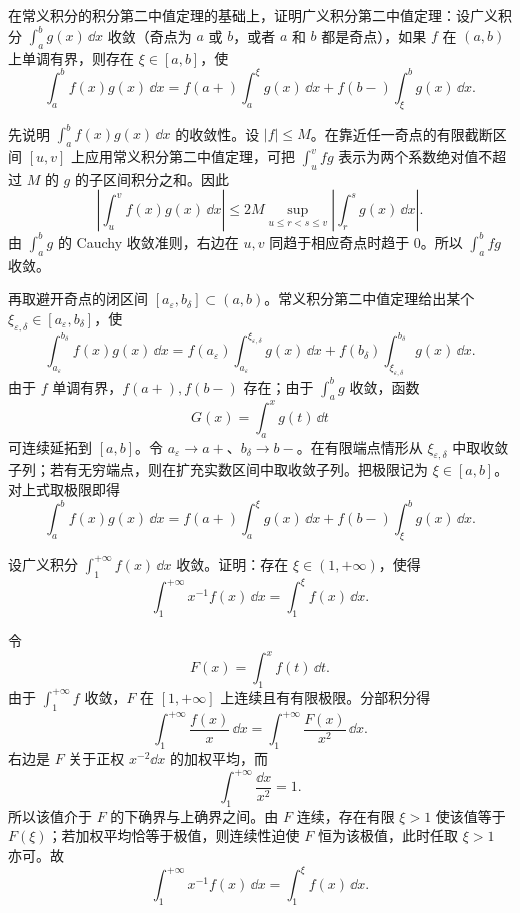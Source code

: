 \begin{xreferenceproblem}[13]
在常义积分的积分第二中值定理的基础上，证明广义积分第二中值定理：设广义积分 $\int_a^b g(x)\,\dd x$ 收敛（奇点为 $a$ 或 $b$，或者 $a$ 和 $b$ 都是奇点），如果 $f$ 在 $(a,b)$ 上单调有界，则存在 $\xi\in[a,b]$，使
  \[
    \int_a^b f(x)g(x)\,\dd x
    =f(a+)\int_a^\xi g(x)\,\dd x+f(b-)\int_\xi^b g(x)\,\dd x.
  \]
\end{xreferenceproblem}
\begin{xsolution}
先说明 $\int_a^b f(x)g(x)\,\dd x$ 的收敛性。设 $|f|\leq M$。在靠近任一奇点的有限截断区间 $[u,v]$ 上应用常义积分第二中值定理，可把
$\int_u^v fg$ 表示为两个系数绝对值不超过 $M$ 的 $g$ 的子区间积分之和。因此
\[
  \left|\int_u^v f(x)g(x)\,\dd x\right|
  \leq2M\sup_{u\leq r<s\leq v}\left|\int_r^s g(x)\,\dd x\right|.
\]
由 $\int_a^b g$ 的 Cauchy 收敛准则，右边在 $u,v$ 同趋于相应奇点时趋于 $0$。所以 $\int_a^b fg$ 收敛。

再取避开奇点的闭区间 $[a_\varepsilon,b_\delta]\subset(a,b)$。常义积分第二中值定理给出某个 $\xi_{\varepsilon,\delta}\in[a_\varepsilon,b_\delta]$，使
\[
  \int_{a_\varepsilon}^{b_\delta}f(x)g(x)\,\dd x
  =f(a_\varepsilon)\int_{a_\varepsilon}^{\xi_{\varepsilon,\delta}}g(x)\,\dd x
  +f(b_\delta)\int_{\xi_{\varepsilon,\delta}}^{b_\delta}g(x)\,\dd x.
\]
由于 $f$ 单调有界，$f(a+),f(b-)$ 存在；由于 $\int_a^b g$ 收敛，函数
\[
  G(x)=\int_a^xg(t)\,\dd t
\]
可连续延拓到 $[a,b]$。令 $a_\varepsilon\to a+$、$b_\delta\to b-$。在有限端点情形从 $\xi_{\varepsilon,\delta}$ 中取收敛子列；若有无穷端点，则在扩充实数区间中取收敛子列。把极限记为 $\xi\in[a,b]$。对上式取极限即得
\[
  \boxed{\int_a^b f(x)g(x)\,\dd x
  =f(a+)\int_a^\xi g(x)\,\dd x
  +f(b-)\int_\xi^b g(x)\,\dd x}.
\]
\end{xsolution}


\begin{xreferenceproblem}[14]
设广义积分 $\int_1^{+\infty}f(x)\,\dd x$ 收敛。证明：存在 $\xi\in(1,+\infty)$，使得
  \[
    \int_1^{+\infty}x^{-1}f(x)\,\dd x=\int_1^\xi f(x)\,\dd x.
  \]
\end{xreferenceproblem}
\begin{xsolution}
令
\[
  F(x)=\int_1^x f(t)\,\dd t.
\]
由于 $\int_1^{+\infty}f$ 收敛，$F$ 在 $[1,+\infty]$ 上连续且有有限极限。分部积分得
\[
  \int_1^{+\infty}\frac{f(x)}x\,\dd x
  =\int_1^{+\infty}\frac{F(x)}{x^2}\,\dd x.
\]
右边是 $F$ 关于正权 $x^{-2}\dd x$ 的加权平均，而
\[
  \int_1^{+\infty}\frac{\dd x}{x^2}=1.
\]
所以该值介于 $F$ 的下确界与上确界之间。由 $F$ 连续，存在有限 $\xi>1$ 使该值等于 $F(\xi)$；若加权平均恰等于极值，则连续性迫使 $F$ 恒为该极值，此时任取 $\xi>1$ 亦可。故
\[
  \boxed{\int_1^{+\infty}x^{-1}f(x)\,\dd x=\int_1^\xi f(x)\,\dd x}.
\]
\end{xsolution}


